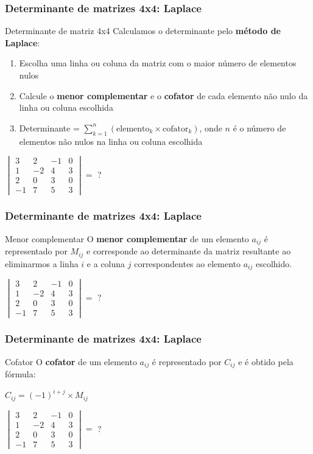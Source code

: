 \documentclass[pdftex, brazil]{beamer}
\begin{document}
\begin{frame}[t]
  \frametitle{Determinante de matrizes 4x4: Laplace}
  \begin{block}{Determinante de matriz 4x4}
    Calculamos o determinante pelo \textbf{método de Laplace}:
    \begin{enumerate}
      \item Escolha uma linha ou coluna da matriz com o maior número de
        elementos nulos
      \item Calcule o \textbf{menor complementar} e o \textbf{cofator} de cada
        elemento não nulo da linha ou coluna escolhida
      \item Determinante = $\displaystyle \sum_{k=1}^n (\text{elemento}_k \times \text{cofator}_k)$,
        onde $n$ é o número de elementos não nulos na linha ou coluna escolhida
    \end{enumerate}
  \end{block}
  $\begin{vmatrix}
    3 & 2 & -1 & 0\\
    1 & -2 & 4 & 3\\
    2 & 0 & 3 & 0\\
    -1 & 7 & 5 & 3\end{vmatrix} =$ ?
\end{frame}

\begin{frame}[t]
  \frametitle{Determinante de matrizes 4x4: Laplace}
  \begin{block}{Menor complementar}
    O \textbf{menor complementar} de um elemento $a_{ij}$ é representado por
    $M_{ij}$ e corresponde ao determinante da matriz resultante ao eliminarmos 
    a linha $i$ e a coluna $j$ correspondentes ao elemento $a_{ij}$ escolhido.
  \end{block}
  $\begin{vmatrix}
    3 & 2 & -1 & 0\\
    1 & -2 & 4 & 3\\
    2 & 0 & 3 & 0\\
    -1 & 7 & 5 & 3\end{vmatrix} =$ ?
\end{frame}

\begin{frame}[t]
  \frametitle{Determinante de matrizes 4x4: Laplace}
  \begin{block}{Cofator}
    O \textbf{cofator} de um elemento $a_{ij}$ é representado por
    $C_{ij}$ e é obtido pela fórmula:
  \begin{center}
    $C_{ij} = (-1)^{i+j} \times M_{ij}$
  \end{center}
  \end{block}
  $\begin{vmatrix}
    3 & 2 & -1 & 0\\
    1 & -2 & 4 & 3\\
    2 & 0 & 3 & 0\\
    -1 & 7 & 5 & 3\end{vmatrix} =$ ?
\end{frame}
\end{document}
